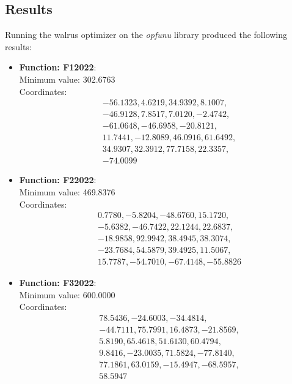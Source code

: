 \documentclass{article}
\begin{document}
  \subsection{Results}

  Running the walrus optimizer on the \textit{opfunu} library
  produced the following results:

  \begin{itemize}
    \item \textbf{Function: F12022}: \\
      Minimum value: 302.6763 \\
      Coordinates:
      \[
        \begin{aligned}
          & -56.1323, 4.6219, 34.9392, 8.1007, \\
          & -46.9128, 7.8517, 7.0120, -2.4742, \\
          & -61.0648, -46.6958, -20.8121, \\
          & 11.7441, -12.8089, 46.0916, 61.6492, \\
          & 34.9307, 32.3912, 77.7158, 22.3357, \\
          & -74.0099
        \end{aligned}
      \]

    \item \textbf{Function: F22022}: \\
      Minimum value: 469.8376 \\
      Coordinates:
      \[
        \begin{aligned}
          & 0.7780, -5.8204, -48.6760, 15.1720, \\
          & -5.6382, -46.7422, 22.1244, 22.6837, \\
          & -18.9858, 92.9942, 38.4945, 38.3074, \\
          & -23.7684, 54.5879, 39.4925, 11.5067, \\
          & 15.7787, -54.7010, -67.4148, -55.8826
        \end{aligned}
      \]

    \item \textbf{Function: F32022}: \\
      Minimum value: 600.0000 \\
      Coordinates:
      \[
        \begin{aligned}
          & 78.5436, -24.6003, -34.4814, \\
          & -44.7111, 75.7991, 16.4873, -21.8569, \\
          & 5.8190, 65.4618, 51.6130, 60.4794, \\
          & 9.8416, -23.0035, 71.5824, -77.8140, \\
          & 77.1861, 63.0159, -15.4947, -68.5957, \\
          & 58.5947
        \end{aligned}
      \]


\end{itemize}
\end{document}
